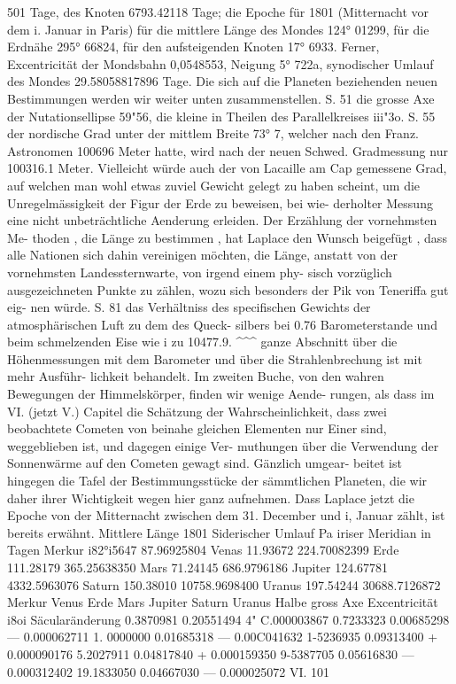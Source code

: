 \documentclass[12pt,a4paper]{article}
\begin{document}
501 Tage,  des  Knoten  6793.42118  Tage;  die  Epoche  für  1801  (Mitternacht  vor  dem  i.  Januar  in  Paris)  für die  mittlere  Länge  des  Mondes  124°  01299,  für  die  Erdnähe  295°  66824,  für  den  aufsteigenden  Knoten 17°  6933.  Ferner,  Excentricität  der  Mondsbahn  0,0548553,  Neigung  5°  722a,  synodischer  Umlauf  des Mondes  29.58058817896  Tage.  Die  sich  auf  die  Planeten  beziehenden  neuen  Bestimmungen  werden  wir weiter  unten  zusammenstellen.  S.  51  die  grosse  Axe  der  Nutationsellipse  59"56,  die  kleine  in  Theilen des  Parallelkreises  iii"3o.  S.  55  der  nordische  Grad  unter  der  mittlem  Breite  73°  7,  welcher  nach  den Franz.  Astronomen  100696  Meter  hatte,  wird  nach  der  neuen  Schwed.  Gradmessung  nur  100316.1  Meter. Vielleicht  würde  auch  der  von  Lacaille  am  Cap  gemessene  Grad,  auf  welchen  man  wohl  etwas  zuviel Gewicht  gelegt  zu  haben  scheint,  um  die  Unregelmässigkeit  der  Figur  der  Erde  zu  beweisen,  bei  wie- derholter Messung  eine  nicht  unbeträchtliche  Aenderung  erleiden.  Der  Erzählung  der  vornehmsten  Me- thoden ,  die  Länge  zu  bestimmen ,  hat  Laplace  den  Wunsch  beigefügt ,  dass  alle  Nationen  sich  dahin vereinigen  möchten,  die  Länge,  anstatt  von  der  vornehmsten  Landessternwarte,  von  irgend  einem  phy- sisch vorzüglich  ausgezeichneten  Punkte  zu  zählen,  wozu  sich  besonders  der  Pik  von  Teneriffa  gut  eig- nen würde.  S.  81  das  Verhältniss  des  specifischen  Gewichts  der  atmosphärischen  Luft  zu  dem  des  Queck- silbers bei  0.76  Barometerstande  und  beim  schmelzenden  Eise  wie  i  zu  10477.9.  \textasciicircum{}\textasciicircum{}\textasciicircum{}  ganze  Abschnitt über  die  Höhenmessungen  mit  dem  Barometer  und  über  die  Strahlenbrechung  ist  mit  mehr  Ausführ- lichkeit behandelt. Im  zweiten  Buche,  von  den  wahren  Bewegungen  der  Himmelskörper,  finden  wir  wenige  Aende- rungen,  als  dass  im  VI.  (jetzt  V.)  Capitel  die  Schätzung  der  Wahrscheinlichkeit,  dass  zwei  beobachtete Cometen  von  beinahe  gleichen  Elementen  nur  Einer  sind,  weggeblieben  ist,  und  dagegen  einige  Ver- muthungen  über  die  Verwendung  der  Sonnenwärme  auf  den  Cometen  gewagt  sind.  Gänzlich  umgear- beitet ist  hingegen  die  Tafel  der  Bestimmungsstücke  der  sämmtlichen  Planeten,  die  wir  daher  ihrer Wichtigkeit  wegen  hier  ganz  aufnehmen.  Dass  Laplace  jetzt  die  Epoche  von  der  Mitternacht  zwischen dem  31.  December  und  i,  Januar  zählt,  ist  bereits  erwähnt. Mittlere  Länge  1801 Siderischer  Umlauf Pa iriser  Meridian in  Tagen Merkur i82°i5647 87.96925804 Venas 11.93672 224.70082399 Erde 111.28179 365.25638350 Mars 71.24145 686.9796186 Jupiter 124.67781 4332.5963076 Saturn 150.38010 10758.9698400 Uranus 197.54244 30688.7126872 Merkur Venus Erde Mars Jupiter Saturn Uranus Halbe  gross Axe Excentricität i8oi Säcularänderung 0.3870981 0.20551494 4"  C.000003867 0.7233323 0.00685298 ---  0.000062711 1. 0000000 0.01685318 ---  0.00C041632 1-5236935 0.09313400 +  0.000090176 5.2027911 0.04817840 +  0.000159350 9-5387705 0.05616830 ---  0.000312402 19.1833050 0.04667030 ---  0.000025072 VI. 101
\end{document}
